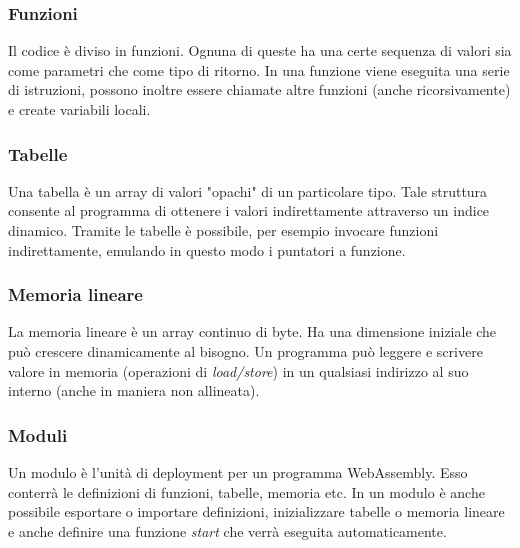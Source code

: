 \subsubsection{Funzioni}
Il codice è diviso in funzioni. Ognuna di queste ha una certe sequenza di valori sia come parametri che come tipo di ritorno. In una funzione viene eseguita una serie di istruzioni, possono inoltre essere chiamate altre funzioni (anche ricorsivamente) e create variabili locali.
\subsubsection{Tabelle}
Una tabella è un array di valori "opachi" di un particolare tipo. Tale struttura consente al programma di ottenere i valori indirettamente attraverso un indice dinamico. Tramite le tabelle è possibile, per esempio invocare funzioni indirettamente, emulando in questo modo i puntatori a funzione.
\subsubsection{Memoria lineare}
La memoria lineare è un  array continuo di byte. Ha una dimensione iniziale che può crescere dinamicamente al bisogno. Un programma può leggere e scrivere valore in memoria (operazioni di \emph{load/store}) in un qualsiasi indirizzo al suo interno (anche in maniera non allineata).
\subsubsection{Moduli}
Un modulo è l'unità di deployment per un programma WebAssembly. Esso conterrà le definizioni di funzioni, tabelle, memoria etc. In un modulo è anche possibile esportare o importare definizioni, inizializzare tabelle o memoria lineare e anche definire una funzione \emph{start} che verrà eseguita automaticamente. 
